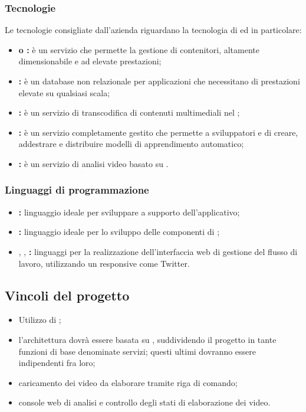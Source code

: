     \subsubsection{Tecnologie}
    Le tecnologie consigliate dall'azienda riguardano la tecnologia di  ed in particolare:
    \begin{itemize}
        \item \textbf{ o : }è un servizio che permette la gestione di contenitori, altamente dimensionabile e ad elevate prestazioni;
        \item \textbf{: }è un database non relazionale per applicazioni che necessitano di prestazioni elevate su qualsiasi scala;
        \item \textbf{: }è un servizio di transcodifica di contenuti multimediali nel ;
        \item \textbf{: }è un servizio completamente gestito che permette a sviluppatori e  di creare, addestrare e distribuire modelli di apprendimento automatico;
        \item \textbf{: }è un servizio di analisi video basato su .
    \end{itemize}
        \subsubsection{Linguaggi di programmazione}
        \begin{itemize}
            \item \textbf{: }linguaggio ideale per sviluppare   a supporto dell'applicativo;
            \item \textbf{: }linguaggio ideale per lo sviluppo delle componenti di ;
            \item \textbf{}, \textbf{}, \textbf{: }linguaggi per la realizzazione dell'interfaccia web di gestione del flusso di lavoro, utilizzando un  responsive come Twitter.
        \end{itemize}
    \subsection{Vincoli del progetto}
    \begin{itemize}
        \item Utilizzo di ;
        \item l'architettura dovrà essere basata su , suddividendo il progetto in tante funzioni di base denominate servizi; questi ultimi dovranno essere indipendenti fra loro;
        \item caricamento dei video da elaborare tramite riga di comando;
        \item console web di analisi e controllo degli stati di elaborazione dei video.
      \end{itemize}

